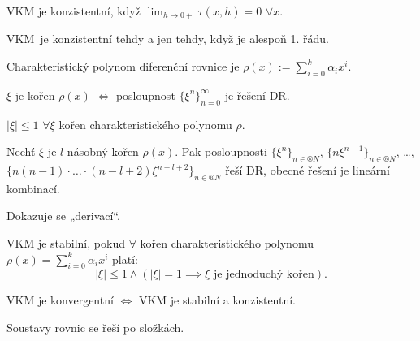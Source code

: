 \documentclass[12pt]{article}					%
\begin{document}
	\begin{definice}
		VKM je konzistentní, když $\lim_{h \rightarrow 0+} \tau(x, h) = 0$ $\forall x$.
	\end{definice}

	\begin{lemma}
		VKM je konzistentní tehdy a jen tehdy, když je alespoň 1. řádu.
	\end{lemma}

	\begin{definice}
		Charakteristický polynom diferenční rovnice je $\rho(x) := \sum_{i=0}^k \alpha_i x^i$.
	\end{definice}

	\begin{lemma}
		$\xi$ je kořen $\rho(x)$ $\Leftrightarrow$ posloupnost $\{\xi^n\}_{n=0}^∞$ je řešení DR.
	\end{lemma}

	\begin{poznamka}
		$|\xi| ≤ 1$ $\forall \xi$ kořen charakteristického polynomu $\rho$.
	\end{poznamka}

	\begin{lemma}
		Nechť $\xi$ je $l$-násobný kořen $\rho(x)$. Pak posloupnosti $\{\xi^n\}_{n \in ®N}$, $\{n \xi^{n-1}\}_{n \in ®N}$, …, $\{n(n-1)·…·(n - l + 2)\xi^{n - l + 2}\}_{n \in ®N}$ řeší DR, obecné řešení je lineární kombinací.

		\begin{dukazin}
			Dokazuje se „derivací“.
		\end{dukazin}
	\end{lemma}

	\begin{definice}
		VKM je stabilní, pokud $\forall$ kořen charakteristického polynomu $\rho(x) = \sum_{i=0}^k \alpha_i x^i$ platí:
		$$ |\xi| ≤ 1 \land (|\xi| = 1 \implies \xi \text{ je jednoduchý kořen}). $$
	\end{definice}

	\begin{veta}[?]
		VKM je konvergentní $\Leftrightarrow$ VKM je stabilní a konzistentní.
	\end{veta}

	\begin{poznamka}
		Soustavy rovnic se řeší po složkách.
	\end{poznamka}
\end{document}
